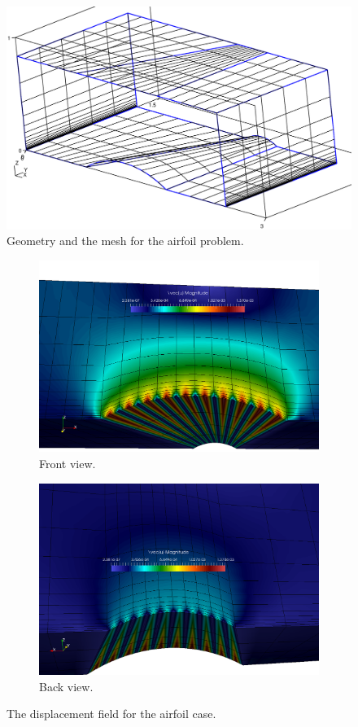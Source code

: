 \documentclass[letter,12pt]{article}
\begin{document}

\begin{figure}
  \centering
  \includegraphics[width=.8\linewidth,center]{bump-mesh.eps}
  \caption{Geometry and the mesh for the airfoil problem.}
  \label{fig:bump-mesh}
\end{figure}

\begin{figure}
  \begin{subfigure}{0.9\textwidth}
  \includegraphics[width=.9\linewidth, center]{bump-front-3d.png}
  \caption{Front view.}
  \end{subfigure}
  \begin{subfigure}{0.9\textwidth}
  \includegraphics[width=.9\linewidth, center]{bump-back-3d.png}
  \caption{Back view.}
  \end{subfigure}
  \caption{The displacement field for the airfoil case. }
  \label{fig:bump-u}
\end{figure}
\end{document}
